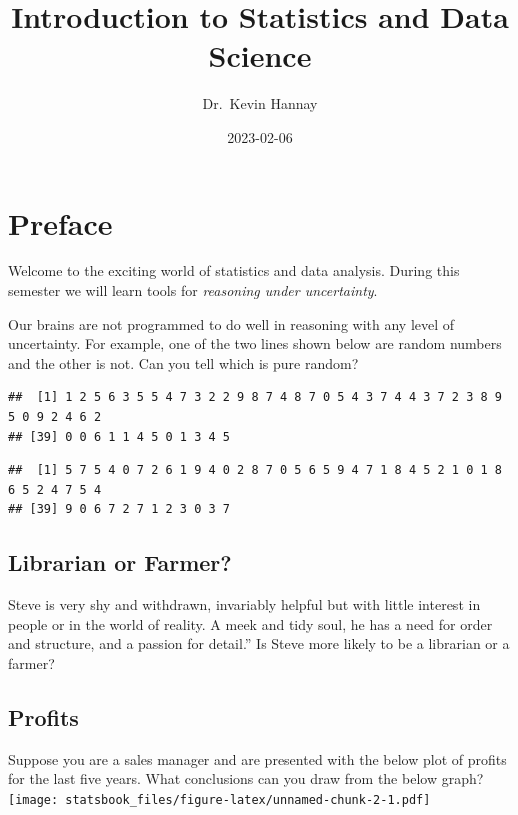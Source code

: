 \documentclass[
]{book}
\title{Introduction to Statistics and Data Science}
\author{Dr.~Kevin Hannay}
\date{2023-02-06}
\theoremstyle{definition}
\theoremstyle{definition}
\theoremstyle{definition}
\theoremstyle{definition}
\theoremstyle{remark}
\begin{document}
\maketitle

{
\setcounter{tocdepth}{1}
\tableofcontents
}
\hypertarget{preface}{%
\chapter{Preface}\label{preface}}

Welcome to the exciting world of statistics and data analysis. During this semester we will learn tools for \emph{reasoning under uncertainty}.

Our brains are not programmed to do well in reasoning with any level of uncertainty. For example, one of the two lines shown below are random numbers and the other is not. Can you tell which is pure random?

\begin{verbatim}
##  [1] 1 2 5 6 3 5 5 4 7 3 2 2 9 8 7 4 8 7 0 5 4 3 7 4 4 3 7 2 3 8 9 5 0 9 2 4 6 2
## [39] 0 0 6 1 1 4 5 0 1 3 4 5
\end{verbatim}

\begin{verbatim}
##  [1] 5 7 5 4 0 7 2 6 1 9 4 0 2 8 7 0 5 6 5 9 4 7 1 8 4 5 2 1 0 1 8 6 5 2 4 7 5 4
## [39] 9 0 6 7 2 7 1 2 3 0 3 7
\end{verbatim}

\hypertarget{librarian-or-farmer}{%
\section{Librarian or Farmer?}\label{librarian-or-farmer}}

Steve is very shy and withdrawn, invariably helpful but with little interest in people or in the world of reality. A meek and tidy soul, he has a need for order and structure, and a passion for detail.'' Is Steve more likely to be a librarian or a farmer?

\hypertarget{profits}{%
\section{Profits}\label{profits}}

Suppose you are a sales manager and are presented with the below plot of profits for the last five years. What conclusions can you draw from the below graph?
\texttt{[image: statsbook\_files/figure-latex/unnamed-chunk-2-1.pdf]}
\end{document}
